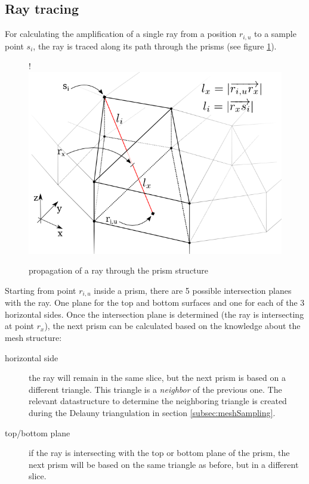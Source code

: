 \subsection{Ray tracing}
\label{subsec:raytracing}

For calculating the amplification of a single ray from a position $r_{i,u}$ to a sample
point $s_i$, the ray is traced along its path through the prisms (see figure
\ref{graphic:prism_propagation}). 

\begin{figure}[H]
  \centerline{
     {!} {\includegraphics{./graphics/prism_propagation_3.png}}
  }
  \caption{propagation of a ray through the prism structure}
  \label{graphic:prism_propagation}
\end{figure}

Starting from point $r_{i,u}$ inside a prism, there are 5 possible intersection
planes with the ray. One plane for the top and bottom surfaces and one for each
of the 3 horizontal sides. Once the intersection plane is determined (the ray is
intersecting at point $r_x$), the next prism can be calculated based on the
knowledge about the mesh structure:

\begin{description}

  \item[horizontal side]
    the ray will remain in the same slice, but the next prism is based on a
    different triangle. This triangle is a \emph{neighbor} of the previous one.
    The relevant datastructure to determine the neighboring triangle is created
    during the Delauny triangulation in section \ref{subsec:meshSampling}.

  \item[top/bottom plane]
    if the ray is intersecting with the top or bottom plane of the prism, the
    next prism will be based on the same triangle as before, but in a different
    slice.

\end{description}

